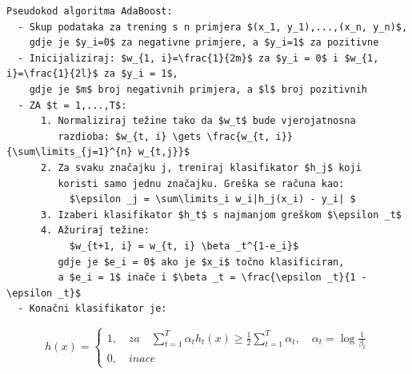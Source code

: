 \begin{lstlisting}
Pseudokod algoritma AdaBoost:
  - Skup podataka za trening s n primjera $(x_1, y_1),...,(x_n, y_n)$,
    gdje je $y_i=0$ za negativne primjere, a $y_i=1$ za pozitivne
  - Inicijaliziraj: $w_{1, i}=\frac{1}{2m}$ za $y_i = 0$ i $w_{1, i}=\frac{1}{2l}$ za $y_i = 1$,
    gdje je $m$ broj negativnih primjera, a $l$ broj pozitivnih
  - ZA $t = 1,...,T$:
      1. Normaliziraj težine tako da $w_t$ bude vjerojatnosna 
         razdioba: $w_{t, i} \gets \frac{w_{t, i}}{\sum\limits_{j=1}^{n} w_{t,j}}$
      2. Za svaku značajku j, treniraj klasifikator $h_j$ koji
         koristi samo jednu značajku. Greška se računa kao:
           $\epsilon _j = \sum\limits_i w_i|h_j(x_i) - y_i| $
      3. Izaberi klasifikator $h_t$ s najmanjom greškom $\epsilon _t$
      4. Ažuriraj težine:
           $w_{t+1, i} = w_{t, i} \beta _t^{1-e_i}$
         gdje je $e_i = 0$ ako je $x_i$ točno klasificiran,
         a $e_i = 1$ inače i $\beta _t = \frac{\epsilon _t}{1 - \epsilon _t}$
  - Konačni klasifikator je:
\end{lstlisting}
\[
	h(x) = 
	\begin{cases}
	 1, \quad za \quad  \sum\limits_{t=1}^{T} \alpha _t h_t(x) \geq \frac{1}{2} \sum\limits_{t=1}^{T} \alpha _t, \quad \alpha _t = \log{\frac{1}{\beta _t}} \\ 
	 0,	\quad inace
	\end{cases}
\]

